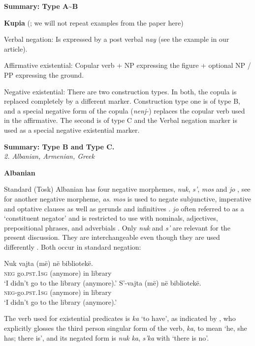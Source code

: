 ﻿\documentclass[output=paper]{langsci/langscibook}
\begin{document}
\begin{unindented}
\textbf{Summary: Type A{\textasciitilde}B}

\textbf{Kupia} (\cites{Christmas1973a}{Christmas1973b}; we will not repeat examples from the paper here)

Verbal negation: Is expressed by a post verbal \textit{nay} (see the example in our article). 

Affirmative existential: Copular verb + NP expressing the figure + optional NP / PP expressing the ground.

Negative existential: There are two construction types. In both, the copula is replaced completely by a different marker. Construction type one is of type B, and a special negative form of the copula (\textit{nenj-}) replaces the copular verb used in the affirmative. The second is of type C and the Verbal negation marker is used as a special negative existential marker.

\textbf{Summary: Type B and Type C.}\\

\textit{2. Albanian, Armenian, Greek}

\textbf{Albanian}

Standard (Tosk) Albanian has four negative morphemes, \textit{nuk},
\textit{s’}, \textit{mos} and \textit{jo} \citep[82]{Turano2000}, see
\citet[172]{BuchholzFiedler1987} for another negative morpheme,
\textit{as}. \textit{mos} is used to negate subjunctive, imperative and
optative clauses as well as gerunds and infinitives \citep[85]{Turano2000}.
\textit{jo} often referred to as a `constituent negator' and is restricted
to use with nominals, adjectives, prepositional phrases, and adverbials
\citep[86]{Turano2000}. Only \textit{nuk} and \textit{s’} are relevant for
the present discussion. They are interchangeable even though they are used
differently \parencite[172]{BuchholzFiedler1987}. Both occur in standard negation:
%
\begin{exe}\ex \gll Nuk vajta (më) në bibliotekë.  \\
\textsc{neg} go.\textsc{pst.1sg} (anymore) in library \\
    \glt `I didn't go to the library (anymore).' \citep[82]{Turano2000}
\ex \gll S’-vajta (më) në bibliotekë.  \\
\textsc{neg}-go.\textsc{pst}.\textsc{1sg} (anymore) in library \\
    \glt `I didn't go to the library (anymore).' \citep[82]{Turano2000}
    \end{exe}

The verb used for existential predicates is \textit{ka} `to have', as
indicated by \citet[12]{Camaj1984}, who explicitly glosses the third person
singular form of the verb, \textit{ka}, to mean `he, she has; there is',
and its negated form is \textit{nuk ka}, \textit{s’ka} with `there is no'. 


\end{unindented}
\end{document}
